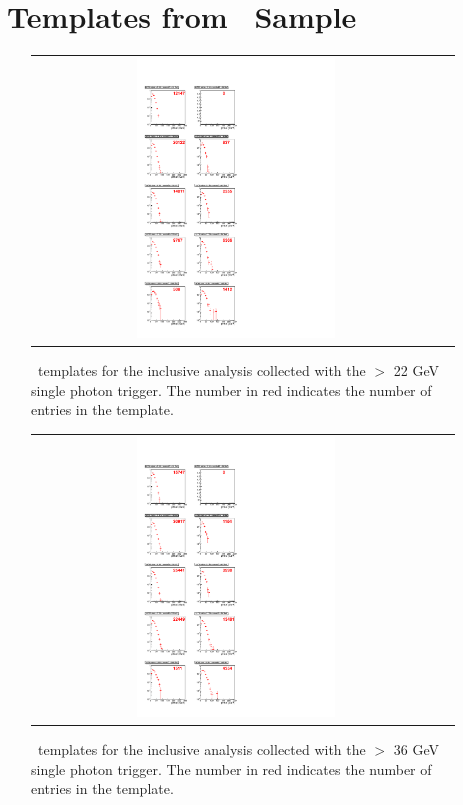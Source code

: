 \clearpage

\section{\MET\ Templates from \gjets\ Sample}
\label{app:templates}

\begin{figure}[!h]
\begin{center}
\begin{tabular}{cc}
\includegraphics[width=0.5\textwidth]{plots/template_inclusive_0.pdf}
\end{tabular}
\caption{
\MET\ templates for the inclusive analysis collected with the \pt $>$ 22 GeV single photon trigger.
The number in red indicates the number of entries in the template.
}
\end{center}
\end{figure}

\clearpage

\begin{figure}[!h]
\begin{center}
\begin{tabular}{cc}
\includegraphics[width=0.5\textwidth]{plots/template_inclusive_1.pdf}
\end{tabular}
\caption{
\MET\ templates for the inclusive analysis collected with the \pt $>$ 36 GeV single photon trigger.
The number in red indicates the number of entries in the template.
}
\end{center}
\end{figure}

